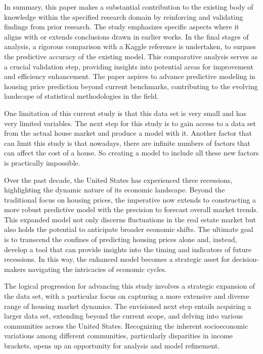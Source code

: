 \documentclass[12pt]{article}
\begin{document}
In summary, this paper makes a substantial contribution to the existing body of knowledge within the specified research domain by reinforcing and validating findings from prior research. The study emphasizes specific aspects where it aligns with or extends conclusions drawn in earlier works. In the final stages of analysis, a rigorous comparison with a Kaggle reference is undertaken, to surpass the predictive accuracy of the existing model. This comparative analysis serves as a crucial validation step, providing insights into potential areas for improvement and efficiency enhancement. The paper aspires to advance predictive modeling in housing price prediction beyond current benchmarks, contributing to the evolving landscape of statistical methodologies in the field.

One limitation of this current study is that this data set is very small and has very limited variables. The next step for this study is to gain access to a data set from the actual house market and produce a model with it. Another factor that can limit this study is that nowadays, there are infinite numbers of factors that can affect the cost of a house. So creating a model to include all these new factors is practically impossible. 

Over the past decade, the United States has experienced three recessions, highlighting the dynamic nature of its economic landscape. Beyond the traditional focus on housing prices, the imperative now extends to constructing a more robust predictive model with the precision to forecast overall market trends. This expanded model not only discerns fluctuations in the real estate market but also holds the potential to anticipate broader economic shifts. The ultimate goal is to transcend the confines of predicting housing prices alone and, instead, develop a tool that can provide insights into the timing and indicators of future recessions. In this way, the enhanced model becomes a strategic asset for decision-makers navigating the intricacies of economic cycles.

The logical progression for advancing this study involves a strategic expansion of the data set, with a particular focus on capturing a more extensive and diverse range of housing market dynamics. The envisioned next step entails acquiring a larger data set, extending beyond the current scope, and delving into various communities across the United States. Recognizing the inherent socioeconomic variations among different communities, particularly disparities in income brackets, opens up an opportunity for analysis and model refinement.
\end{document}
